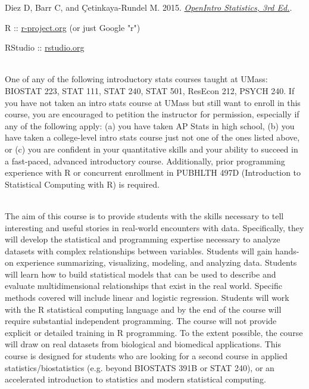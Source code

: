 \documentclass[10pt]{article}
\begin{document}
  
Diez D, Barr C, and \c{C}etinkaya-Rundel M. 2015. \emph{\href{http://www.openintro.org/stat/index.php}{OpenIntro Statistics, 3rd Ed.}}.



R :: \href{http://www.r-project.org}{r-project.org} (or just Google "r")

RStudio :: \href{http://www.rstudio.org}{rstudio.org}


\bigskip
{}\\
One of any of the following introductory stats courses taught at UMass: BIOSTAT 223, STAT 111, STAT 240, STAT 501, ResEcon 212, PSYCH 240. If you have not taken an intro stats course at UMass but still want to enroll in this course, you are encouraged to petition the instructor for permission, especially if any of the following apply: (a) you have taken AP Stats in high school, (b) you have taken a college-level intro stats course just not one of the ones listed above, or (c) you are confident in your quantitative skills and your ability to succeed in a fast-paced, advanced introductory course. Additionally, prior programming experience with R or concurrent enrollment in PUBHLTH 497D (Introduction to Statistical Computing with R) is required.


\bigskip
{}\\ 
The aim of this course is to provide students with the skills necessary to tell interesting and useful stories in real-world encounters with data. Specifically, they will develop the statistical and programming expertise necessary to analyze datasets with complex relationships between variables. Students will gain hands-on experience summarizing, visualizing, modeling, and analyzing data. Students will learn how to build statistical models that can be used to describe and evaluate multidimensional relationships that exist in the real world. Specific methods covered will include linear and logistic regression. Students will work with the R statistical computing language and by the end of the course will require substantial independent programming. The course will not provide explicit or detailed training in R programming. To the extent possible, the course will draw on real datasets from biological and biomedical applications. This course is designed for students who are looking for a second course in applied statistics/biostatistics (e.g. beyond BIOSTATS 391B or STAT 240), or an accelerated introduction to statistics and modern statistical computing.
\end{document}
